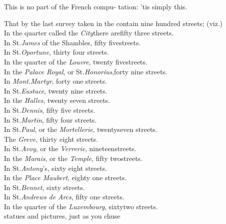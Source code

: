 \documentclass[twoside]{article}
\begin{document}
This is no part of the French compu-\break
tation: ’tis simply this.

That by the last survey taken in the\break
{} 
contain nine hundred streets; (viz.)\\[2pt]
In the quarter called the \textit{City}\tsk there are\bnq fifty three streets.\\
In St.\@ \textit{James} of the Shambles, fifty five\bnq streets.\\
In St.\@ \textit{Oportune}, thirty four streets.\\
In the quarter of the \textit{Louvre}, twenty five\bnq streets.\\
In the \textit{Palace Royal}, or St.\@ \textit{Honorius},\bnq forty nine streets.\\
In \textit{Mont.\@ Martyr}, forty one streets.\\
In St.\@ \textit{Eustace}, twenty nine streets.\\
\newpage\noindent
In the \textit{Halles}, twenty seven streets.\\
In St.\@ \textit{Dennis}, fifty five streets.\\
In St.\@ \textit{Martin}, fifty four streets.\\
In St.\@ \textit{Paul}, or the \textit{Mortellerie}, twenty\bnq seven streets.\\
The \textit{Greve}, thirty eight streets.\\
In St.\@ \textit{Avoy}, or the \textit{Verrerie}, nineteen\bnq streets.\\
In the \textit{Marais}, or the \textit{Temple}, fifty two\bnq streets.\\
In St.\@ \textit{Antony}’s, sixty eight streets.\\
In the \textit{Place Maubert}, eighty one streets.\\
In St.\@ \textit{Bennet}, sixty streets.\\
In St.\@ \textit{Andrews de Arcs}, fifty one streets.\\
In the quarter of the \textit{Luxembourg}, sixty\bnq two streets.\\[2pt]
statues and pictures, just as you chuse\tsk
\end{document}
